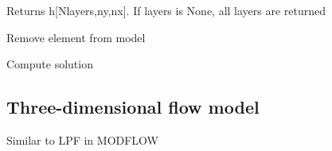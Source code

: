 \documentclass[letterpaper,10pt,english]{sphinxmanual}
\begin{document}
\begin{fulllineitems}
\begin{fulllineitems}
\end{fulllineitems}


\begin{fulllineitems}
\label{\detokenize{models/modelmaq:timml.model.ModelMaq.headgrid2}}
Returns h{[}Nlayers,ny,nx{]}. If layers is None, all layers are returned

\end{fulllineitems}


\begin{fulllineitems}
\label{\detokenize{models/modelmaq:timml.model.ModelMaq.remove_element}}
Remove element  from model

\end{fulllineitems}


\begin{fulllineitems}
\label{\detokenize{models/modelmaq:timml.model.ModelMaq.solve}}
Compute solution

\end{fulllineitems}


\end{fulllineitems}



\subsection{Three-dimensional flow model}
\label{\detokenize{models/model3d::doc}}\label{\detokenize{models/model3d:three-dimensional-flow-model}}
Similar to LPF in MODFLOW
\end{document}

